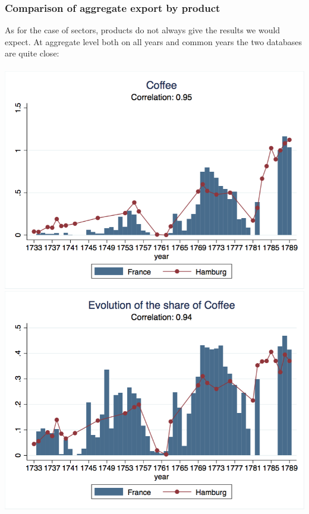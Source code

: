 \documentclass[12pt,a4paper,titlepage,english]{article}
\begin{document}
\subsubsection{Comparison of aggregate export by product}
As for the case of sectors, products do not always give the results we would expect. At aggregate level both on all years and common years the two databases are quite close:\\~\\
\includegraphics[scale=.28]{coffee_long.png}
\includegraphics[scale=.28]{coffee_share_long.png}\\
\newpage
{}
\end{document}
